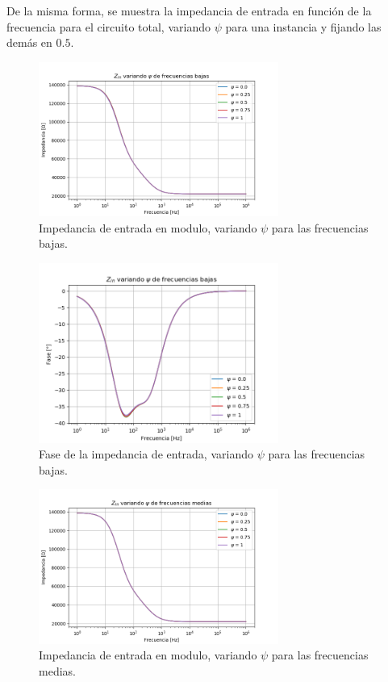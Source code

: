 De la misma forma, se muestra la impedancia de entrada en función de la frecuencia para el circuito total, variando $\psi$ para una instancia y fijando las demás en $0.5$.
\begin{figure}[H]
\centering
	\includegraphics[width=0.7\textwidth, trim = {0 0 0 1.35cm}, clip]{Imagenes/Zin-Low-Mod.png}
	\caption{Impedancia de entrada en modulo, variando $\psi$ para las frecuencias bajas.}
	\label{fig:zin_modulo_low}
\end{figure}
\begin{figure}[H]
\centering
	\includegraphics[width=0.7\textwidth, trim = {0 0 0 1.35cm}, clip]{Imagenes/Zin-Low-Ph.png}
	\caption{Fase de la impedancia de entrada, variando $\psi$ para las frecuencias bajas.}
	\label{fig:zin_ph_low}
\end{figure}
\begin{figure}[H]
\centering
	\includegraphics[width=0.7\textwidth, trim = {0 0 0 1.35cm}, clip]{Imagenes/Zin-Med-Mod.png}
	\caption{Impedancia de entrada en modulo, variando $\psi$ para las frecuencias medias.}
	\label{fig:zin_modulo_med}
\end{figure}

